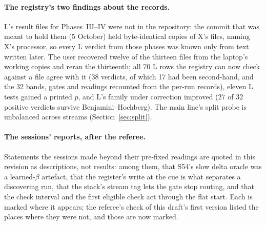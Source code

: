 \documentclass[11pt]{article}
\begin{document}
\paragraph{The registry's two findings about the records.} L's result files for Phases~III--IV were not in the repository: the commit that was meant to hold them (5 October) held byte-identical copies of X's files, naming X's processor, so every L verdict from those phases was known only from text written later. The user recovered twelve of the thirteen files from the laptop's working copies and reran the thirteenth; all 70 L rows the registry can now check against a file agree with it (38 verdicts, of which 17 had been second-hand, and the 32 bands, gates and readings recounted from the per-run records), eleven L tests gained a printed $p$, and L's family under correction improved (27 of 32 positive verdicts survive Benjamini--Hochberg). The main line's split probe is unbalanced across streams (Section~\ref{sec:split}).

\paragraph{The sessions' reports, after the referee.} Statements the sessions made beyond their pre-fixed readings are quoted in this revision as descriptions, not results: among them, that S54's slow delta oracle was a learned-$\beta$ artefact, that the register's write at the cue is what separates a discovering run, that the stack's stream tag lets the gate stop routing, and that the check interval and the first eligible check act through the flat start. Each is marked where it appears; the referee's check of this draft's first version listed the places where they were not, and those are now marked.
\end{document}
